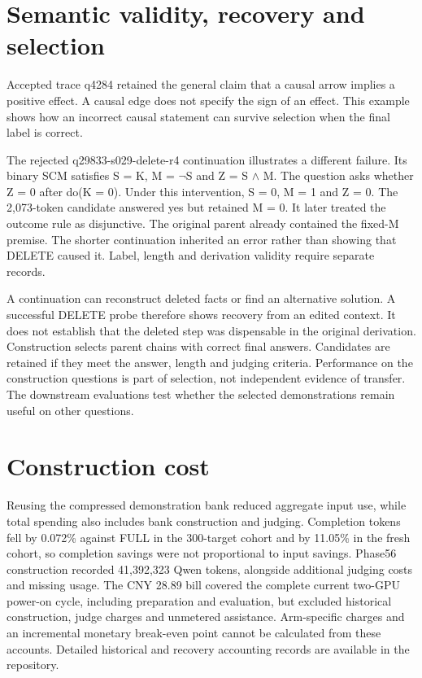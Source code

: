 \section{Semantic validity, recovery and selection}\label{sec:7.2}

Accepted trace q4284 retained the general claim that a causal arrow implies a positive effect. A causal edge does not specify the sign of an effect. This example shows how an incorrect causal statement can survive selection when the final label is correct.

The rejected q29833-s029-delete-r4 continuation illustrates a different failure. Its binary SCM satisfies S = K, M = \ensuremath{\neg}S and Z = S \ensuremath{\land} M. The question asks whether Z = 0 after do(K = 0). Under this intervention, S = 0, M = 1 and Z = 0. The 2,073-token candidate answered yes but retained M = 0. It later treated the outcome rule as disjunctive. The original parent already contained the fixed-M premise. The shorter continuation inherited an error rather than showing that DELETE caused it. Label, length and derivation validity require separate records.

A continuation can reconstruct deleted facts or find an alternative solution. A successful DELETE probe therefore shows recovery from an edited context. It does not establish that the deleted step was dispensable in the original derivation. Construction selects parent chains with correct final answers. Candidates are retained if they meet the answer, length and judging criteria. Performance on the construction questions is part of selection, not independent evidence of transfer. The downstream evaluations test whether the selected demonstrations remain useful on other questions.

\section{Construction cost}\label{sec:7.3}

Reusing the compressed demonstration bank reduced aggregate input use, while total spending also includes bank construction and judging. Completion tokens fell by 0.072\% against FULL in the 300-target cohort and by 11.05\% in the fresh cohort, so completion savings were not proportional to input savings. Phase56 construction recorded 41,392,323 Qwen tokens, alongside additional judging costs and missing usage. The CNY 28.89 bill covered the complete current two-GPU power-on cycle, including preparation and evaluation, but excluded historical construction, judge charges and unmetered assistance. Arm-specific charges and an incremental monetary break-even point cannot be calculated from these accounts. Detailed historical and recovery accounting records are available in the repository.

